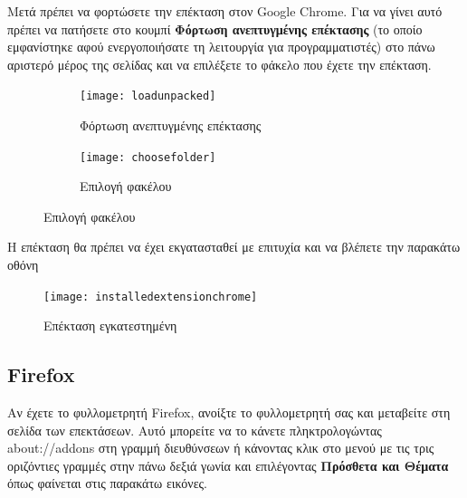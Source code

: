 \documentclass{article}
\begin{document}
Μετά πρέπει να φορτώσετε την επέκταση στον Google Chrome. Για να γίνει αυτό πρέπει να πατήσετε στο κουμπί \textbf{Φόρτωση ανεπτυγμένης επέκτασης} (το οποίο εμφανίστηκε αφού ενεργοποιήσατε τη λειτουργία για προγραμματιστές) στο πάνω αριστερό μέρος της σελίδας και να επιλέξετε το φάκελο που έχετε την επέκταση.
\begin{figure}[H]
    \centering
    \begin{minipage}[t]{0.45\textwidth}
        \centering
        \begin{subfigure}[t]{\textwidth}
            \texttt{[image: loadunpacked]}
        \caption{Φόρτωση ανεπτυγμένης επέκτασης}
        \label{Fig:loadunpacked}
        \end{subfigure}
        \vspace{\fill}
    \end{minipage}
    \hfill
    \begin{minipage}{0.45\textwidth}
        \begin{subfigure}{\textwidth}
            \texttt{[image: choosefolder]}
            \caption{Επιλογή φακέλου}
            \label{Fig:choosefolder}
        \end{subfigure}
    \end{minipage}
\end{figure}

Η επέκταση θα πρέπει να έχει εκγατασταθεί με επιτυχία και να βλέπετε την παρακάτω οθόνη
\begin{figure}[H]
    \texttt{[image: installedextensionchrome]}
    \caption*{Επέκταση εγκατεστημένη}
\end{figure}

\cleardoublepage
{}
\subsection*{Firefox}
Αν έχετε το φυλλομετρητή Firefox, ανοίξτε το φυλλομετρητή σας και μεταβείτε στη σελίδα των επεκτάσεων. Αυτό μπορείτε να το κάνετε πληκτρολογώντας about://addons στη γραμμή διευθύνσεων ή κάνοντας κλικ στο μενού με τις τρις οριζόντιες γραμμές στην πάνω δεξιά γωνία και επιλέγοντας \textbf{Πρόσθετα και Θέματα} όπως φαίνεται στις παρακάτω εικόνες. 
\end{document}

